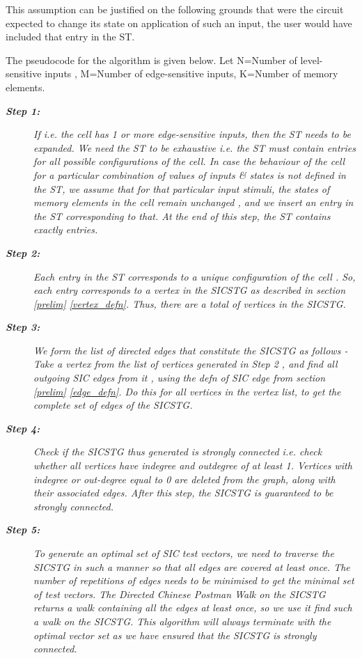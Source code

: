 \documentclass[final]{ieee}
\begin{document}
This assumption can be justified on the following grounds that were the circuit expected to change its state on application of such an input, the user would have included that entry in the ST. 

The pseudocode for the algorithm is given below.
Let N=Number of level-sensitive inputs , M=Number of edge-sensitive inputs, K=Number of memory elements.

\begin{description}
\item [\textit{\textbf{Step 1:}}] \textit{If  i.e. the cell has 1 or more edge-sensitive inputs, then the ST needs to be expanded. We need the ST to be exhaustive i.e. the ST must contain entries for all possible configurations of the cell. In case the behaviour of the cell for a particular combination of values of inputs \& states is not defined in the ST, we assume that for that particular input stimuli, the states of memory elements in the cell remain unchanged , and we insert an entry in the ST corresponding to that. At the end of this step, the ST contains exactly  entries.}

\item [\textit{\textbf{Step 2:}}] \textit{Each entry in the ST corresponds to a unique configuration of the cell . So, each entry corresponds to a vertex in the SICSTG as described in section \ref{prelim} \ref{vertex_defn}. Thus, there are a total of  vertices in the SICSTG.}

\item [\textit{\textbf{Step 3:}}] \textit{We form the list of directed edges that constitute the SICSTG as follows - Take a vertex from the list of vertices generated in Step 2 , and find all outgoing SIC edges from it , using the defn of SIC edge from section \ref{prelim} \ref{edge_defn}. Do this for all vertices in the vertex list, to get the complete set of edges of the SICSTG.}

\item [\textit{\textbf{Step 4:}}] \textit{Check if the SICSTG thus generated is strongly connected i.e. check whether all vertices have indegree and outdegree of at least 1. Vertices with indegree or out-degree equal to 0 are deleted from the graph, along with their associated edges. After this step, the SICSTG is guaranteed to be strongly connected.}

\item [\textit{\textbf{Step 5:}}] \textit{To generate an optimal set of SIC test vectors, we need to traverse the SICSTG in such a manner so that all edges are covered at least once. The number of repetitions of edges needs to be minimised to get the minimal set of test vectors. The Directed Chinese Postman Walk on the SICSTG returns a walk containing all the edges at least once, so we use it find such a walk on the SICSTG. This algorithm will always terminate with the optimal vector set as we have ensured that the SICSTG is strongly connected.}
\end{description}
\end{document}
